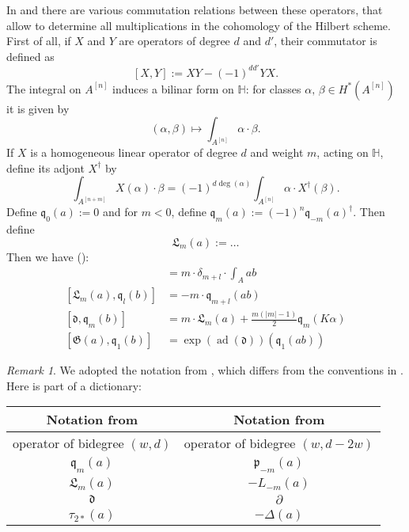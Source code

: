\documentclass{amsart}
\DeclareMathOperator{\ad}{ad}
\newcommand{\hilb}[1]{^{[#1]}}
\newcommand{\p}{\mathfrak{p}}
\newcommand{\G}{\mathfrak{G}}
\newcommand{\q}{\mathfrak{q}}
\renewcommand{\H}{\mathbb{H}}
\theoremstyle{plain}
\theoremstyle{definition}
\theoremstyle{remark}
\newtheorem{remark}[theorem]{Remark}
\begin{document}
In \cite{LehnSorger} and \cite{LiQinWang} there are various commutation relations between these operators, that allow to determine all multiplications in the cohomology of the Hilbert scheme. First of all, if $X$ and $Y$ are operators of degree $d$ and $d'$, their commutator is defined as 
$$
[X,Y] := XY - (-1)^{dd'}YX.
$$
The integral on $A\hilb{n}$ induces a bilinar form on $\H$: for classes $\alpha,\,\beta\in H^*(A\hilb{n})$ it is given by
$$
(\alpha,\beta) \longmapsto \int_{A\hilb{n}}\alpha\cdot\beta.
$$
If $X$ is a homogeneous linear operator of degree $d$ and weight $m$, acting on $\H$, define its adjont $X^\dagger$ by
$$
\int_{A\hilb{n+m}}X(\alpha)\cdot\beta = (-1)^{d\deg(\alpha)}\int_{A\hilb{n}} \alpha \cdot X^\dagger (\beta).
$$
Define $\q_0(a) :=0$ and for $m<0$, define $\q_m(a) := (-1)^n \q_{-m}(a)^\dagger$. Then define
$$
\mathfrak{L}_m(a) := \ldots
$$
Then we have (\cite[Thm.~2.16]{LiQinWang}):
\begin{align}
[\q_m(a), \q_l(b)] &= m\cdot \delta_{m+l} \cdot \int_A ab \\
[\mathfrak{L}_m(a),\q_l(b)] &= -m\cdot \q_{m+l}(ab) \\
[\mathfrak{d},\q_m(b)] &= m \cdot \mathfrak{L}_m(a) + \tfrac{m(|m|-1)}{2} \q_m(K\alpha) \\
[\G(a),\q_1(b)] &= \exp(\ad(\mathfrak{d}))(\q_1(a b) )
\end{align}

\begin{remark}
We adopted the notation from \cite{LiQinWang}, which differs from the conventions in \cite{LehnSorger}. Here is part of a dictionary:

\begin{tabular}{c|c} 
Notation from \cite{LiQinWang} & Notation from \cite{LehnSorger} \\\hline
operator of bidegree $(w,d)$ & operator of bidegree $(w,d-2w)$\\
$\q_m(a) $ & $\p_{-m}(a)$ \\
$ \mathfrak{L}_m(a) $ & $ - L_{-m}(a)$ \\
$ \mathfrak{d} $ & $ \partial $ \\
$\tau_{2*}(a)$& $-\Delta(a)$
\end{tabular}


\end{remark}
\end{document}
